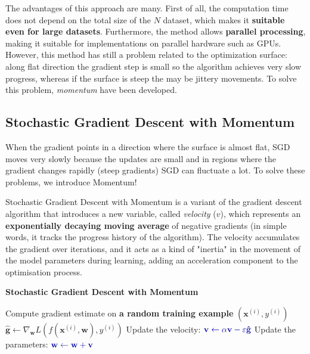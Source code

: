 The advantages of this approach are many. First of all, the computation time does not depend on the total size of the $N$ dataset, which makes it \textbf{suitable even for large datasets}. Furthermore, the method allows \textbf{parallel processing}, making it suitable for implementations on parallel hardware such as GPUs. However, this method has still a problem related to the optimization surface: along flat direction the gradient step is small so the algorithm achieves very slow progress, whereas if the surface is steep the may be jittery movements.  To solve this problem, \textit{momentum} have been developed.

\subsection{Stochastic Gradient Descent with Momentum}
When the gradient points in a direction where the surface is almost flat, SGD moves very slowly because the updates are small and in regions where the gradient changes rapidly (steep gradients) SGD can fluctuate a lot. To solve these problems, we introduce Momentum!

Stochastic Gradient Descent with Momentum is a variant of the gradient descent algorithm that introduces a new variable, called \textit{velocity} (\(v\)), which represents an \textbf{exponentially decaying moving average} of negative gradients (in simple words, it tracks the progress history of the algorithm). The velocity accumulates the gradient over iterations, and it acts as a kind of "inertia" in the movement of the model parameters during learning, adding an acceleration component to the optimisation process.

\begin{algorithm}
\renewcommand\thealgorithm{}
\caption{\textbf{\textcolor{mygreen}{Stochastic Gradient Descent with Momentum}}}
\begin{algorithmic}[1]
    \STATE Compute gradient estimate on \textbf{\textcolor{myred}{a random training example}} $(\mathbf{x}^{(i)}, y^{(i)})$
    \STATE 
    $
    \mathbf{\hat{g}} \leftarrow\nabla_{\mathbf{w}} L(f(\mathbf{x}^{(i)},\mathbf{w}), y^{(i)})
    $
    \STATE Update the velocity:
    $\textcolor{mybluee}{\mathbf{v} \leftarrow \alpha \mathbf{v} - \varepsilon \mathbf{\hat{g}}}$
    \STATE Update the parameters:
    $\textcolor{mybluee}{\mathbf{w} \leftarrow \mathbf{w} + \mathbf{v}}$
\ENDWHILE
\end{algorithmic}
\end{algorithm}

